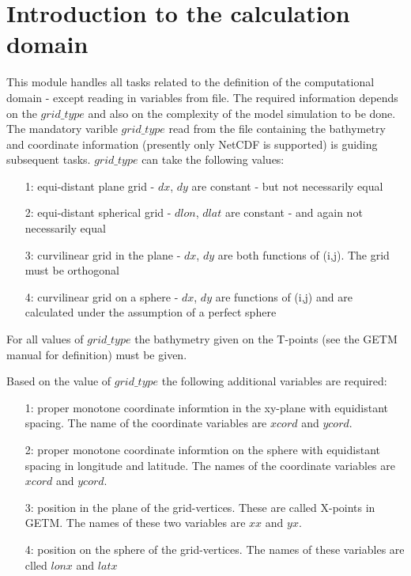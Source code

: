 
\section{Introduction to the calculation domain}

\vspace{0.5cm}

  This module handles all tasks related to the definition of the
  computational domain - except reading in variables from file.
  The required information depends on the $grid\_type$ and also on the
  complexity of the model simulation to be done.\newline
  The mandatory varible $grid\_type$ read from the file containing
  the bathymetry and coordinate information (presently only NetCDF
  is supported) is guiding subsequent tasks. $grid\_type$ can take
  the following values:
  \begin{itemize}
      \item[1:] equi-distant plane grid - $dx$, $dy$ are constant - but
                not necessarily equal
      \item[2:] equi-distant spherical grid  - $dlon$, $dlat$ are
                constant - and again not necessarily  equal
      \item[3:] curvilinear grid in the plane - $dx$, $dy$ are both
                functions of (i,j). The grid must be orthogonal
      \item[4:] curvilinear grid on a sphere - $dx$, $dy$ are functions
                of (i,j) and are calculated under the assumption of a
                perfect sphere
  \end{itemize}

  For all values of $grid\_type$ the bathymetry given on the T-points
  (see the GETM manual for definition) must be given.\newline

  Based on the value of $grid\_type$ the following additional variables
  are required:
  \begin{itemize}
      \item[1:] proper monotone coordinate informtion in the xy-plane
                with equidistant spacing. The name of the coordinate
                variables are $xcord$ and $ycord$.
      \item[2:] proper monotone coordinate informtion on the sphere
                with equidistant spacing in longitude and latitude. The
                names of the coordinate variables are $xcord$ and $ycord$.
      \item[3:] position in the plane of the grid-vertices. These are
                called X-points in GETM. The names of these two variables
                are $xx$ and $yx$.
      \item[4:] position on the sphere of the grid-vertices. The names
                of these variables are clled $lonx$ and $latx$
  \end{itemize}

